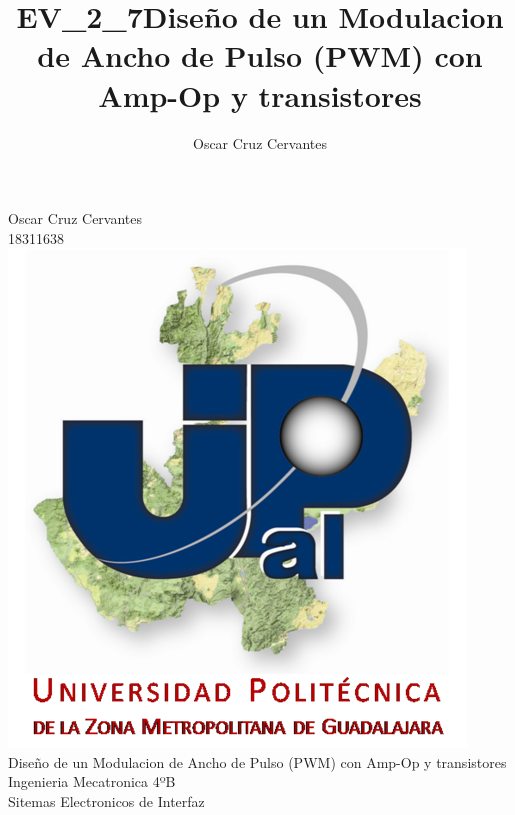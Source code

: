 \documentclass[12pt,a4paper]{report}
\author{Oscar Cruz Cervantes}
\title{EV_2_7Diseño de un Modulacion de Ancho de Pulso (PWM) con Amp-Op y transistores}
\begin{document}
\begin{center}
Oscar Cruz Cervantes\\
18311638\\
\includegraphics[scale=2]{01.png}\\
Diseño de un Modulacion de Ancho de Pulso (PWM) con Amp-Op y transistores\\
Ingenieria Mecatronica 4ºB\\
Sitemas Electronicos de Interfaz\\
\end{center}
\newpage
\end{document}

